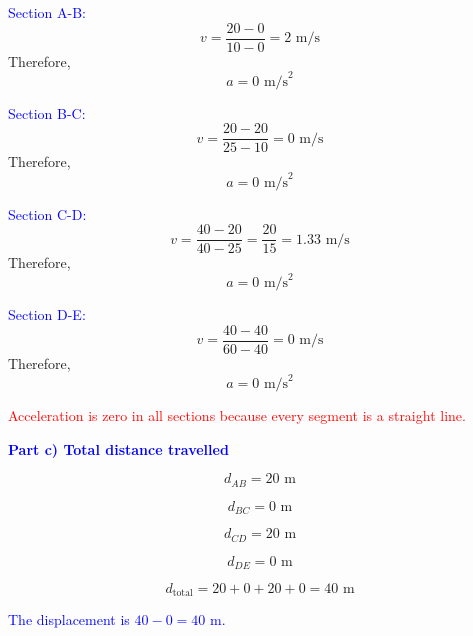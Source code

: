 \begin{exercise}
\begin{solu}
        \textcolor{blue}{Section A-B:}
        \[
        v=\frac{20-0}{10-0}=2\text{ m/s}
        \]
        Therefore,
        \[
        \boxed{a=0\text{ m/s}^2}
        \]

        \textcolor{blue}{Section B-C:}
        \[
        v=\frac{20-20}{25-10}=0\text{ m/s}
        \]
        Therefore,
        \[
        \boxed{a=0\text{ m/s}^2}
        \]

        \textcolor{blue}{Section C-D:}
        \[
        v=\frac{40-20}{40-25}=\frac{20}{15}=1.33\text{ m/s}
        \]
        Therefore,
        \[
        \boxed{a=0\text{ m/s}^2}
        \]

        \textcolor{blue}{Section D-E:}
        \[
        v=\frac{40-40}{60-40}=0\text{ m/s}
        \]
        Therefore,
        \[
        \boxed{a=0\text{ m/s}^2}
        \]

        \textcolor{red}{Acceleration is zero in all sections because every segment is a straight line.}

        \vspace{0.5cm}

        \textbf{\textcolor{blue}{Part c) Total distance travelled}}

        \[
        d_{AB}=20\text{ m}
        \]

        \[
        d_{BC}=0\text{ m}
        \]

        \[
        d_{CD}=20\text{ m}
        \]

        \[
        d_{DE}=0\text{ m}
        \]

        \[
        d_{\text{total}}=20+0+20+0=\boxed{40\text{ m}}
        \]

        \textcolor{blue}{The displacement is $40-0=40$ m.}
    \end{solu}
\end{exercise}

